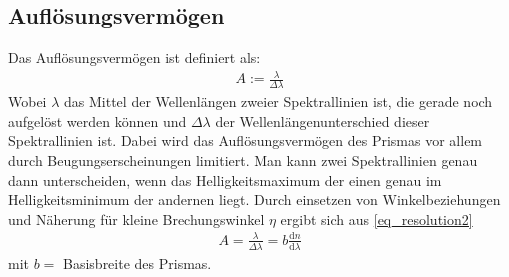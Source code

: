 \subsection{Auflösungsvermögen}
Das Auflösungsvermögen ist definiert als:
\begin{align}
	A := \frac{\lambda}{\Delta\lambda}
	\label{eq_resolution2}
\end{align}
Wobei $\lambda$ das Mittel der Wellenlängen zweier Spektrallinien ist, die gerade noch aufgelöst werden können und $\Delta\lambda$ der Wellenlängenunterschied dieser Spektrallinien ist.
Dabei wird das Auflösungsvermögen des Prismas vor allem durch Beugungserscheinungen limitiert. Man kann zwei Spektrallinien genau dann unterscheiden, wenn das Helligkeitsmaximum der einen genau im Helligkeitsminimum der andernen liegt.
Durch einsetzen von Winkelbeziehungen und Näherung für kleine Brechungswinkel $\eta$ ergibt sich aus \eqref{eq_resolution2}
\begin{align}
A = \frac{\lambda}{\Delta\lambda} = b\frac{\text{d}n}{\text{d}\lambda}
\label{eq_resolution}
\end{align}
mit $b =$ Basisbreite des Prismas.

